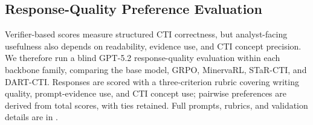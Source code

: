 








\subsection{Response-Quality Preference Evaluation}
\label{sec:qualitative}

Verifier-based scores measure structured CTI correctness, but analyst-facing usefulness also depends on readability, evidence use, and CTI concept precision. We therefore run a blind GPT-5.2 response-quality evaluation within each backbone family, comparing the base model, GRPO, MinervaRL, STaR-CTI, and DART-CTI. Responses are scored with a three-criterion rubric covering writing quality, prompt-evidence use, and CTI concept use; pairwise preferences are derived from total scores, with ties retained. Full prompts, rubrics, and validation details are in .





